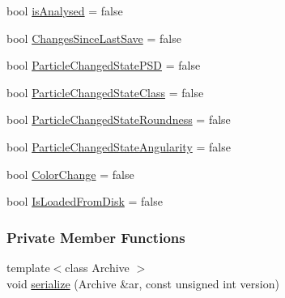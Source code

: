 \begin{DoxyCompactItemize}
\item 
bool \hyperlink{class_soil_analyzer_1_1_sample_a7534ad473783de2ffd2b34c97ae86902}{is\+Analysed} = false
\item 
bool \hyperlink{class_soil_analyzer_1_1_sample_aee3c3cf30c0201c695d82ca3a8dd0d8b}{Changes\+Since\+Last\+Save} = false
\item 
bool \hyperlink{class_soil_analyzer_1_1_sample_af35befb868658ac10fe18fb544000377}{Particle\+Changed\+State\+P\+S\+D} = false
\item 
bool \hyperlink{class_soil_analyzer_1_1_sample_ad2efb0f5bee8910f2a2fb69353a7de6d}{Particle\+Changed\+State\+Class} = false
\item 
bool \hyperlink{class_soil_analyzer_1_1_sample_af2ed93f3cbdc06660e7b846bd4feb7fc}{Particle\+Changed\+State\+Roundness} = false
\item 
bool \hyperlink{class_soil_analyzer_1_1_sample_a7ee3c324a437d466c014cbbfcfb4a244}{Particle\+Changed\+State\+Angularity} = false
\item 
bool \hyperlink{class_soil_analyzer_1_1_sample_accbcd4ae4cc33c94a1b1a4d255d4868f}{Color\+Change} = false
\item 
bool \hyperlink{class_soil_analyzer_1_1_sample_ad078b5aae9d86f5d8fc7ec871381b138}{Is\+Loaded\+From\+Disk} = false
\end{DoxyCompactItemize}
\subsubsection*{Private Member Functions}
\begin{DoxyCompactItemize}
\item 
{\footnotesize template$<$class Archive $>$ }\\void \hyperlink{class_soil_analyzer_1_1_sample_a5be6eea7a7d74e0adec741d1e203635e}{serialize} (Archive \&ar, const unsigned int version)
\end{DoxyCompactItemize}
